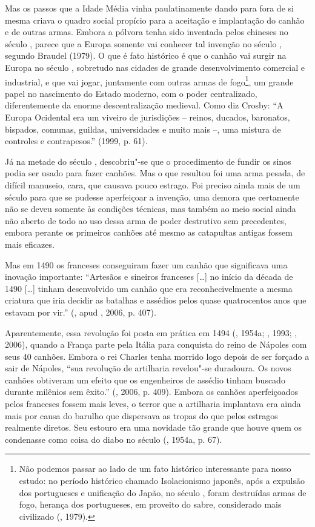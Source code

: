 Mas os passos que a Idade Média vinha paulatinamente dando para fora de
si mesma criava o quadro social propício para a aceitação e implantação
do canhão e de outras armas. Embora a pólvora tenha sido inventada pelos
chineses no século , parece que a Europa somente vai conhecer tal
invenção no século , segundo Braudel (1979). O que é fato histórico
é que o canhão vai surgir na Europa no século , sobretudo nas cidades
de grande desenvolvimento comercial e industrial, e que vai jogar,
juntamente com outras armas de fogo\footnote{Não podemos passar ao lado
  de um fato histórico interessante para nosso estudo: no período
  histórico chamado Isolacionismo japonês, após a expulsão dos
  portugueses e unificação do Japão, no século , foram destruídas
  armas de fogo, herança dos portugueses, em proveito do sabre,
  considerado mais civilizado (, 1979).}, um grande papel no
nascimento do Estado moderno, com o poder centralizado, diferentemente
da enorme descentralização medieval. Como diz Crosby: ``A Europa
Ocidental era um viveiro de jurisdições -- reinos, ducados, baronatos,
bispados, comunas, guildas, universidades e muito mais --, uma mistura
de controles e contrapesos.'' (1999, p. 61).

Já na metade do século , descobriu"-se que o procedimento de fundir os
sinos podia ser usado para fazer canhões. Mas o que resultou foi uma
arma pesada, de difícil manuseio, cara, que causava pouco estrago. Foi
preciso ainda mais de um século para que se pudesse aperfeiçoar a
invenção, uma demora que certamente não se deveu somente às condições
técnicas, mas também ao meio social ainda não aberto de todo ao uso
dessa arma de poder destrutivo sem precedentes, embora perante os
primeiros canhões até mesmo as catapultas antigas fossem mais eficazes.

Mas em 1490 os franceses conseguiram fazer um canhão que significava uma
inovação importante: ``Artesãos e sineiros franceses [\ldots{}] no
início da década de 1490 [\ldots{}] tinham desenvolvido um canhão
que era reconhecivelmente a mesma criatura que iria decidir as batalhas
e assédios pelos quase quatrocentos anos que estavam por vir.'' (,
apud , 2006, p. 407).

Aparentemente, essa revolução foi posta em prática em 1494 (, 1954a;
, 1993; , 2006), quando a França parte pela Itália para
conquista do reino de Nápoles com seus 40 canhões. Embora o rei Charles
 tenha morrido logo depois de ser forçado a sair de Nápoles, ``sua
revolução de artilharia revelou"-se duradoura. Os novos canhões obtiveram
um efeito que os engenheiros de assédio tinham buscado durante milênios
sem êxito.'' (, 2006, p. 409). Embora os canhões aperfeiçoados
pelos franceses fossem mais leves, o terror que a artilharia implantava
era ainda mais por causa do barulho que dispersava as tropas do que
pelos estragos realmente diretos. Seu estouro era uma novidade tão
grande que houve quem os condenasse como coisa do diabo no século 
(, 1954a, p. 67).

